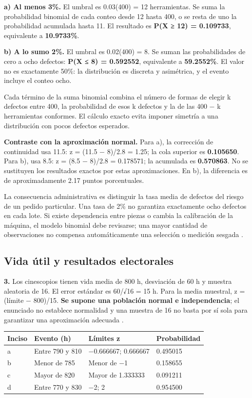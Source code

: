{\textbf{a) Al menos 3\%.} El umbral es 0.03(400) = 12 herramientas. Se suma la probabilidad binomial de cada conteo desde 12 hasta 400, o se resta de uno la probabilidad acumulada hasta 11. El resultado es \textbf{P(X ≥ 12) = 0.109733}, equivalente a \textbf{10.9733\%}.

\textbf{b) A lo sumo 2\%.} El umbral es 0.02(400) = 8. Se suman las probabilidades de cero a ocho defectos: \textbf{P(X ≤ 8) = 0.592552}, equivalente a \textbf{59.2552\%}. El valor no es exactamente 50\%: la distribución es discreta y asimétrica, y el evento incluye el conteo ocho.

Cada término de la suma binomial combina el número de formas de elegir k defectos entre 400, la probabilidad de esos k defectos y la de las 400 − k herramientas conformes. El cálculo exacto evita imponer simetría a una distribución con pocos defectos esperados.

\textbf{Contraste con la aproximación normal.} Para a), la corrección de continuidad usa 11.5: z = (11.5 − 8)/2.8 = 1.25; la cola superior es \textbf{0.105650}. Para b), usa 8.5: z = (8.5 − 8)/2.8 = 0.178571; la acumulada es \textbf{0.570863}. No se sustituyen los resultados exactos por estas aproximaciones. En b), la diferencia es de aproximadamente 2.17 puntos porcentuales.

La consecuencia administrativa es distinguir la tasa media de defectos del riesgo de un pedido particular. Una tasa de 2\% no garantiza exactamente ocho defectos en cada lote. Si existe dependencia entre piezas o cambia la calibración de la máquina, el modelo binomial debe revisarse; una mayor cantidad de observaciones no compensa automáticamente una selección o medición sesgada \citep{bradley2021}.

\clearpage
\subsection{Vida útil y resultados electorales}
\textbf{3.} Los cinescopios tienen vida media de 800 h, desviación de 60 h y muestra aleatoria de 16. El error estándar es 60/√16 = 15 h. Para la media muestral, z = (límite − 800)/15. \textbf{Se supone una población normal e independencia}; el enunciado no establece normalidad y una muestra de 16 no basta por sí sola para garantizar una aproximación adecuada \citep{holmesBusiness2023}.

\begin{center}
\begin{tabular}{llll}
\textbf{Inciso} & \textbf{Evento (h)} & \textbf{Límites z} & \textbf{Probabilidad}\\\hline
a & Entre 790 y 810 & −0.666667; 0.666667 & 0.495015\\
b & Menor de 785 & Menor de −1 & 0.158655\\
c & Mayor de 820 & Mayor de 1.333333 & 0.091211\\
d & Entre 770 y 830 & −2; 2 & 0.954500\\
\end{tabular}
\end{center}

}
